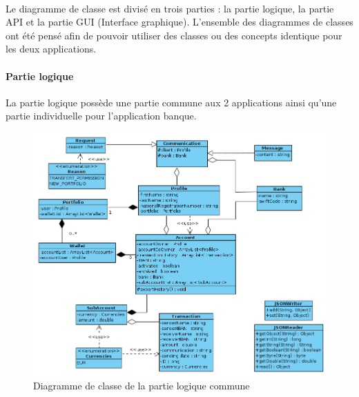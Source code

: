\documentclass[]{article}
\begin{document}
\paragraph{}Le diagramme de classe est divisé en trois parties : la partie logique, la partie API et la partie GUI (Interface graphique). L'ensemble des diagrammes de classes ont été pensé afin de pouvoir utiliser des classes ou des concepts identique pour les deux applications.

    \paragraph{Partie logique}
    La partie logique possède une partie commune aux 2 applications ainsi qu'une partie individuelle pour l’application banque.

    \begin{figure}[ht]
    \centering
    \includegraphics[scale=0.35]{img/ClassCommonPart.png}
    \caption{Diagramme de classe de la partie logique commune}
    \label{fig1}
    \end{figure}
\end{document}
